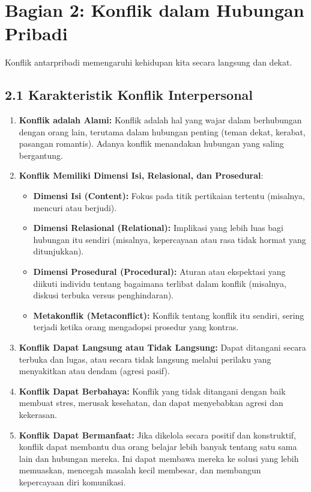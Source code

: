 \documentclass[
  letterpaper,
  DIV=11,
  numbers=noendperiod]{scrreprt}
\providecommand{\tightlist}{%
  \setlength{\itemsep}{0pt}\setlength{\parskip}{0pt}}
\begin{document}
\section{Bagian 2: Konflik dalam Hubungan
Pribadi}\label{bagian-2-konflik-dalam-hubungan-pribadi}

Konflik antarpribadi memengaruhi kehidupan kita secara langsung dan
dekat.

\subsection{2.1 Karakteristik Konflik
Interpersonal}\label{karakteristik-konflik-interpersonal}

\begin{enumerate}
\def\labelenumi{\arabic{enumi}.}
\tightlist
\item
  \textbf{Konflik adalah Alami:} Konflik adalah hal yang wajar dalam
  berhubungan dengan orang lain, terutama dalam hubungan penting (teman
  dekat, kerabat, pasangan romantis). Adanya konflik menandakan hubungan
  yang saling bergantung.
\item
  \textbf{Konflik Memiliki Dimensi Isi, Relasional, dan Prosedural}:

  \begin{itemize}
  \tightlist
  \item
    \textbf{Dimensi Isi (Content):} Fokus pada titik pertikaian tertentu
    (misalnya, mencuri atau berjudi).
  \item
    \textbf{Dimensi Relasional (Relational):} Implikasi yang lebih luas
    bagi hubungan itu sendiri (misalnya, kepercayaan atau rasa tidak
    hormat yang ditunjukkan).
  \item
    \textbf{Dimensi Prosedural (Procedural):} Aturan atau ekspektasi
    yang diikuti individu tentang bagaimana terlibat dalam konflik
    (misalnya, diskusi terbuka versus penghindaran).
  \item
    \textbf{Metakonflik (Metaconflict):} Konflik tentang konflik itu
    sendiri, sering terjadi ketika orang mengadopsi prosedur yang
    kontras.
  \end{itemize}
\item
  \textbf{Konflik Dapat Langsung atau Tidak Langsung:} Dapat ditangani
  secara terbuka dan lugas, atau secara tidak langsung melalui perilaku
  yang menyakitkan atau dendam (agresi pasif).
\item
  \textbf{Konflik Dapat Berbahaya:} Konflik yang tidak ditangani dengan
  baik membuat stres, merusak kesehatan, dan dapat menyebabkan agresi
  dan kekerasan.
\item
  \textbf{Konflik Dapat Bermanfaat:} Jika dikelola secara positif dan
  konstruktif, konflik dapat membantu dua orang belajar lebih banyak
  tentang satu sama lain dan hubungan mereka. Ini dapat membawa mereka
  ke solusi yang lebih memuaskan, mencegah masalah kecil membesar, dan
  membangun kepercayaan diri komunikasi.
\end{enumerate}
\end{document}
